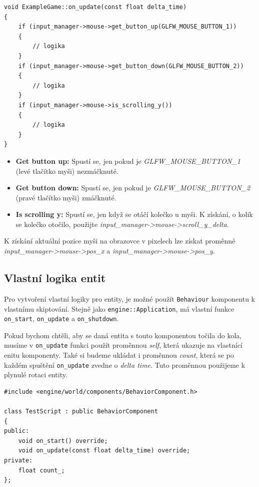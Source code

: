 \documentclass[12pt,a4paper]{article}
\begin{document}
\begin{lstlisting}[caption={Ukázkové získání vstupu myši}]
void ExampleGame::on_update(const float delta_time)
{
    if (input_manager->mouse->get_button_up(GLFW_MOUSE_BUTTON_1))
    {
        // logika
    }
    if (input_manager->mouse->get_button_down(GLFW_MOUSE_BUTTON_2))
    {
        // logika
    }
    if (input_manager->mouse->is_scrolling_y())
    {
        // logika
    }
}
\end{lstlisting}

\begin{itemize}
    \item \textbf{Get button up:} Spustí se, jen pokud je \textit{GLFW\_MOUSE\_BUTTON\_1} (levé tlačítko myši) nezmáčknuté.
    
    \item \textbf{Get button down:} Spustí se, jen pokud je \textit{GLFW\_MOUSE\_BUTTON\_2} (pravé tlačítko myši) zmáčknuté.
    
    \item \textbf{Is scrolling y:} Spustí se, jen když se otáčí kolečko u myši. K získání, o kolik se kolečko otočilo, použijte \textit{input\_manager->mouse->scroll\_y\_delta}.
\end{itemize}

K získání aktuální pozice myši na obrazovce v pixelech lze získat proměnné \textit{input\_manager->mouse->pos\_x} a \textit{input\_manager->mouse->pos\_y}.



\subsection{Vlastní logika entit}
Pro vytvoření vlastní logiky pro entity, je možné použít \texttt{Behaviour} komponentu k vlastnímu skiptování. Stejně jako \texttt{engine::Application}, má vlastní funkce \texttt{on\_start}, \texttt{on\_update} a \texttt{on\_shutdown}.

Pokud bychom chtěli, aby se daná entita s touto komponentou točila do kola, musíme v \texttt{on\_update} funkci použít proměnnou \textit{self}, která ukazuje na vlastnící enitu komponenty. Také si budeme ukládat i proměnnou \textit{count}, která se po každém spuštění \texttt{on\_update} zvedne o \textit{delta time}. Tuto proměnnou použijeme k plynulé rotaci entity.

\begin{lstlisting}[caption={Vytvoření ukázkového behaviour skriptu v TestScript.h}]
#include <engine/world/components/BehaviorComponent.h>

class TestScript : public BehaviorComponent
{
public:
    void on_start() override;
    void on_update(const float delta_time) override;
private:
    float count_;
};
\end{lstlisting}
\end{document}
